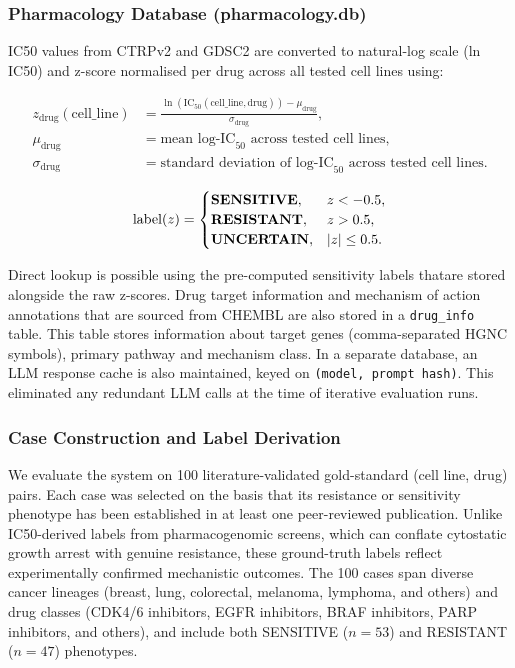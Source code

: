 \documentclass{article}
\begin{document}
\subsubsection{Pharmacology Database (pharmacology.db)}
IC50 values from CTRPv2 and GDSC2 are converted to natural-log scale (ln IC50) and z-score normalised per drug across all tested cell lines using:

\begin{align*}
z_{\mathrm{drug}}(\mathrm{cell\_line})
&=
\frac{
\ln\!\left(\mathrm{IC}_{50}(\mathrm{cell\_line},\mathrm{drug})\right)
-\mu_{\mathrm{drug}}
}{
\sigma_{\mathrm{drug}}
},\\
\mu_{\mathrm{drug}}
&= \text{mean log-IC}_{50}\text{ across tested cell lines},\\
\sigma_{\mathrm{drug}}
&= \text{standard deviation of log-IC}_{50}\text{ across tested cell lines}.
\end{align*}

\[
\operatorname{label}(z)=
\begin{cases}
\text{\textbf{SENSITIVE}}, & z < -0.5,\\
\text{\textbf{RESISTANT}}, & z > 0.5,\\
\text{\textbf{UNCERTAIN}}, & |z| \leq 0.5.
\end{cases}
\]

Direct lookup is possible using the pre-computed sensitivity labels thatare stored alongside the raw z-scores. Drug target information and mechanism of action annotations that are sourced from CHEMBL are also stored in a \texttt{drug\_info} table. This table stores information about target genes (comma-separated HGNC symbols), primary pathway and mechanism class. In a separate database, an LLM response cache is also maintained, keyed on \texttt{(model, prompt hash)}. This eliminated any redundant LLM calls at the time of iterative evaluation runs. 

\subsubsection{Case Construction and Label Derivation}
We evaluate the system on 100 literature-validated gold-standard (cell line, drug) pairs. Each case was selected on the basis that its resistance or sensitivity phenotype has been established in at least one peer-reviewed publication. Unlike IC50-derived labels from pharmacogenomic screens, which can conflate cytostatic growth arrest with genuine resistance, these ground-truth labels reflect experimentally confirmed mechanistic outcomes. The 100 cases span diverse cancer lineages (breast, lung, colorectal, melanoma, lymphoma, and others) and drug classes (CDK4/6 inhibitors, EGFR inhibitors, BRAF inhibitors, PARP inhibitors, and others), and include both SENSITIVE ($n = 53$) and RESISTANT ($n = 47$) phenotypes.
\end{document}
